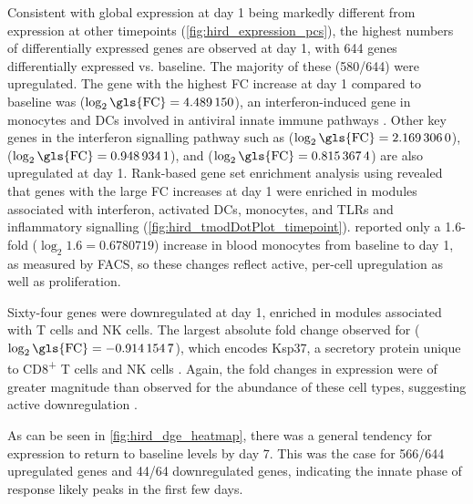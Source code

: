 Consistent with global expression at day 1 being markedly different from expression at other timepoints (\cref{fig:hird_expression_pcs}), the highest numbers of differentially expressed genes are observed at day 1, with 644 genes differentially expressed vs. baseline.
The majority of these (580/644) were upregulated.
The gene with the highest \gls{FC} increase at day 1 compared to baseline was  ($\log_2\text{\gls{FC}} = \num{4.489150}$), an interferon-induced gene in monocytes and \glspl{DC} involved in antiviral innate immune pathways \autocite{bin2016AnkyrinRepeatDomain}.
Other key genes in the interferon signalling pathway \autocite{schneider2014InterferonStimulatedGenesComplex} such as  ($\log_2\text{\gls{FC}} = \num{2.1693060}$),  ($\log_2\text{\gls{FC}} = \num{0.9489341}$), and  ($\log_2\text{\gls{FC}} = \num{0.8153674}$) are also upregulated at day 1.
Rank-based gene set enrichment analysis using  \autocite{weiner3rd2016TmodPackageGeneral} revealed that genes with the large \gls{FC} increases at day 1 were enriched in modules associated with interferon, activated \glspl{DC}, monocytes, and \glspl{TLR} and inflammatory signalling (\cref{fig:hird_tmodDotPlot_timepoint}).
\textcite{sobolev2016AdjuvantedInfluenzaH1N1Vaccination} reported only a 1.6-fold ($\log_2 1.6 = \num{0.6780719}$) increase in blood monocytes from baseline to day 1, as measured by \gls{FACS}, so these changes reflect active, per-cell upregulation as well as proliferation.

Sixty-four genes were downregulated at day 1, enriched in modules associated with T cells and \gls{NK} cells.
The largest absolute fold change observed for  ($\log_2\text{\gls{FC}} = \num{-0.9141547}$), 
which encodes Ksp37, a secretory protein unique to CD8\textsuperscript{+} T cells and \gls{NK} cells \autocite{ogawa2001NovelSerumProtein}.
Again, the fold changes in expression were of greater magnitude than observed for the abundance of these cell types, suggesting active downregulation \textcite{sobolev2016AdjuvantedInfluenzaH1N1Vaccination}.

As can be seen in \cref{fig:hird_dge_heatmap}, there was a general tendency for expression to return to baseline levels by day 7.
This was the case for 566/644 upregulated genes and 44/64 downregulated genes,
indicating the innate phase of response likely peaks in the first few days.

